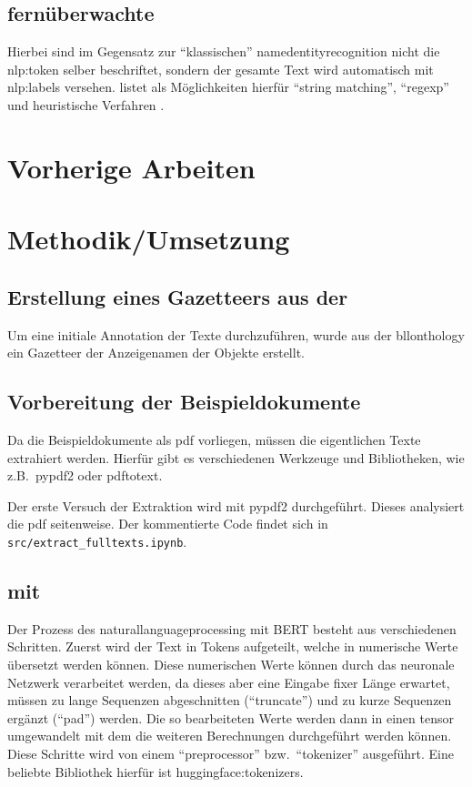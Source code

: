 \documentclass[
german,
]{bachelor}
\begin{document}
\subsection{fernüberwachte }
Hierbei sind im Gegensatz zur \enquote{klassischen} \gls{namedentityrecognition}
nicht die \gls{nlp:token} selber beschriftet,
sondern der gesamte Text wird automatisch mit \glspl{nlp:label} versehen.
\citeauthor{2006.15509} listet als Möglichkeiten hierfür
\enquote{string matching}, \enquote{regexp} und heuristische Verfahren
\autocite{2006.15509}.

\section{Vorherige Arbeiten}


\section{Methodik/Umsetzung}

\subsection{Erstellung eines Gazetteers aus der } %
Um eine initiale Annotation der Texte durchzuführen,
wurde aus der \gls{bllonthology} ein Gazetteer %
der Anzeigenamen der Objekte erstellt.

\subsection{Vorbereitung der Beispieldokumente}
Da die Beispieldokumente als \gls{pdf} vorliegen,
müssen die eigentlichen Texte extrahiert werden.
Hierfür gibt es verschiedenen Werkzeuge und Bibliotheken,
wie z.B.\, \gls{pypdf2} oder \gls{pdftotext}.

Der erste Versuch der Extraktion wird mit \gls{pypdf2} durchgeführt.
Dieses analysiert die \gls{pdf} seitenweise.
Der kommentierte Code findet sich in \texttt{src/extract\_fulltexts.ipynb}.

\subsection{ mit }
Der Prozess des \gls{naturallanguageprocessing} mit \gls{BERT} besteht aus verschiedenen Schritten.
Zuerst wird der Text in Tokens aufgeteilt,
welche in numerische Werte übersetzt werden können.
Diese numerischen Werte können durch das neuronale Netzwerk verarbeitet werden,
da dieses aber eine Eingabe fixer Länge erwartet,
müssen zu lange Sequenzen abgeschnitten (\enquote{truncate})
und zu kurze Sequenzen ergänzt (\enquote{pad}) werden.
Die so bearbeiteten Werte werden dann in einen \gls{tensor} umgewandelt
mit dem die weiteren Berechnungen durchgeführt werden können.
Diese Schritte wird von einem \enquote{preprocessor}
bzw.\, \enquote{tokenizer} ausgeführt.
\autocite{huggingface:docs:Transformers:preprocessing}
Eine beliebte Bibliothek hierfür ist \gls{huggingface:tokenizers}.
\end{document}

